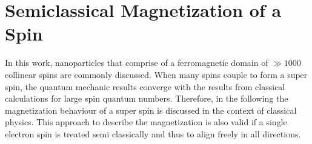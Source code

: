 \documentclass[\main/dresen_thesis.tex]{subfiles}
\begin{document}
\section{Semiclassical Magnetization of a Spin}\label{ch:appendix:calculations:magnetizationClassicalSpin}
In this work, nanoparticles that comprise of a ferromagnetic domain of $\gg 1000$ collinear spins are commonly discussed.
When many spins couple to form a super spin, the quantum mechanic results converge with the results from classical calculations for large spin quantum numbers.
Therefore, in the following the magnetization behaviour of a super spin is discussed in the context of classical physics.
This approach to describe the magnetization is also valid if a single electron spin is treated semi classically and thus to align freely in all directions.
\end{document}
